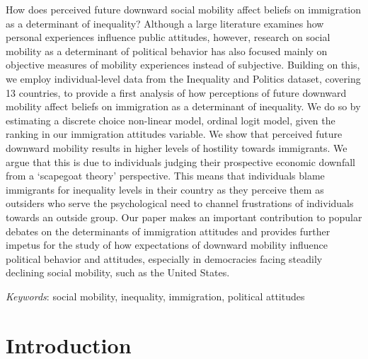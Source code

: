 \documentclass[
  11pt,
]{article}
\renewenvironment{abstract}
 {{%
    \setlength{\leftmargin}{0mm}
    \setlength{\rightmargin}{\leftmargin}%
  }%
  \relax}
 {\endlist}
\begin{document}
\begin{abstract}


    \vskip 8.5pt %

\noindent \small{How does perceived future downward social mobility
affect beliefs on immigration as a determinant of inequality? Although a
large literature examines how personal experiences influence public
attitudes, however, research on social mobility as a determinant of
political behavior has also focused mainly on objective measures of
mobility experiences instead of subjective. Building on this, we employ
individual-level data from the Inequality and Politics dataset, covering
13 countries, to provide a first analysis of how perceptions of future
downward mobility affect beliefs on immigration as a determinant of
inequality. We do so by estimating a discrete choice non-linear model,
ordinal logit model, given the ranking in our immigration attitudes
variable. We show that perceived future downward mobility results in
higher levels of hostility towards immigrants. We argue that this is due
to individuals judging their prospective economic downfall from a
`scapegoat theory' perspective. This means that individuals blame
immigrants for inequality levels in their country as they perceive them
as outsiders who serve the psychological need to channel frustrations of
individuals towards an outside group. Our paper makes an important
contribution to popular debates on the determinants of immigration
attitudes and provides further impetus for the study of how expectations
of downward mobility influence political behavior and attitudes,
especially in democracies facing steadily declining social mobility,
such as the United States.}


\vskip 8.5pt \noindent \emph{Keywords}: social mobility, inequality,
immigration, political attitudes \par




\end{abstract}


\vskip -8.5pt




\setlength{\parindent}{16pt}
\setlength{\parskip}{0pt}

\hypertarget{introduction}{%
\section{Introduction}\label{introduction}}
\end{document}
